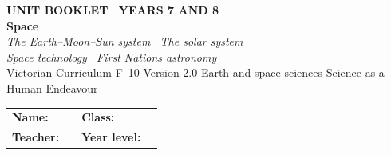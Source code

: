 \documentclass[11pt,a4paper]{article}
\begin{document}

\thispagestyle{plain}

%
\begin{tcolorbox}[
  enhanced, breakable=false, arc=4mm,
  colback=Navy, colframe=Navy,
  left=6mm, right=6mm, top=9mm, bottom=9mm,
  boxrule=0pt
]
  \begin{center}
    {\headingfont\bfseries\color{Gold}\footnotesize\MakeUppercase{Unit Booklet \textbullet\ Years 7 and 8}}\\[10pt]
    {\headingfont\bfseries\color{white}\fontsize{40}{44}\selectfont Space}\\[8pt]
    {\large\color{white!85!Navy}\itshape The Earth--Moon--Sun system \textbullet\ The solar system\\[2pt] Space technology \textbullet\ First Nations astronomy}\\[14pt]
    {\headingfont\color{white!72!Navy}\normalsize
      Victorian Curriculum F--10 Version 2.0 \textbar{}
      Earth and space sciences \textbar{} Science as a Human Endeavour}
  \end{center}
\end{tcolorbox}

\vspace{10pt}

\begin{tabular}{@{}p{2.2cm} p{6cm} p{2.2cm} p{3.4cm}@{}}
  \textbf{Name:}    & \underline{\hspace{5.8cm}} & \textbf{Class:}      & \underline{\hspace{3.2cm}} \\[8pt]
  \textbf{Teacher:} & \underline{\hspace{5.8cm}} & \textbf{Year level:} & \underline{\hspace{3.2cm}} \\
\end{tabular}
\end{document}
